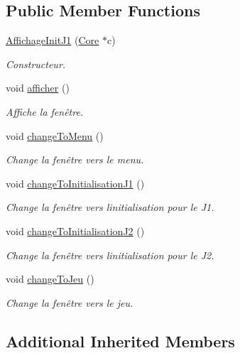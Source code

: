 \subsection*{Public Member Functions}
\begin{DoxyCompactItemize}
\item 
\hyperlink{class_affichage_init_j1_ac184edfaeebae278b71348584817cf3f}{Affichage\+Init\+J1} (\hyperlink{class_core}{Core} $\ast$c)
\begin{DoxyCompactList}\small\item\em Constructeur. \end{DoxyCompactList}\item 
void \hyperlink{class_affichage_init_j1_a469000a4072c712f88ee75ed6cc03d3b}{afficher} ()
\begin{DoxyCompactList}\small\item\em Affiche la fenêtre. \end{DoxyCompactList}\item 
void \hyperlink{class_affichage_init_j1_ac579f8933a11bc3e49923d414b20acab}{change\+To\+Menu} ()
\begin{DoxyCompactList}\small\item\em Change la fenêtre vers le menu. \end{DoxyCompactList}\item 
void \hyperlink{class_affichage_init_j1_a07ee576320b2bd22733ac142fd10b14c}{change\+To\+Initialisation\+J1} ()
\begin{DoxyCompactList}\small\item\em Change la fenêtre vers l\textquotesingle{}initialisation pour le J1. \end{DoxyCompactList}\item 
void \hyperlink{class_affichage_init_j1_ad1f6286f0aa162fec476d69049a2c1a8}{change\+To\+Initialisation\+J2} ()
\begin{DoxyCompactList}\small\item\em Change la fenêtre vers l\textquotesingle{}initialisation pour le J2. \end{DoxyCompactList}\item 
void \hyperlink{class_affichage_init_j1_a4fcbe1401407498fc32e5cedf797a9e4}{change\+To\+Jeu} ()
\begin{DoxyCompactList}\small\item\em Change la fenêtre vers le jeu. \end{DoxyCompactList}\end{DoxyCompactItemize}
\subsection*{Additional Inherited Members}


